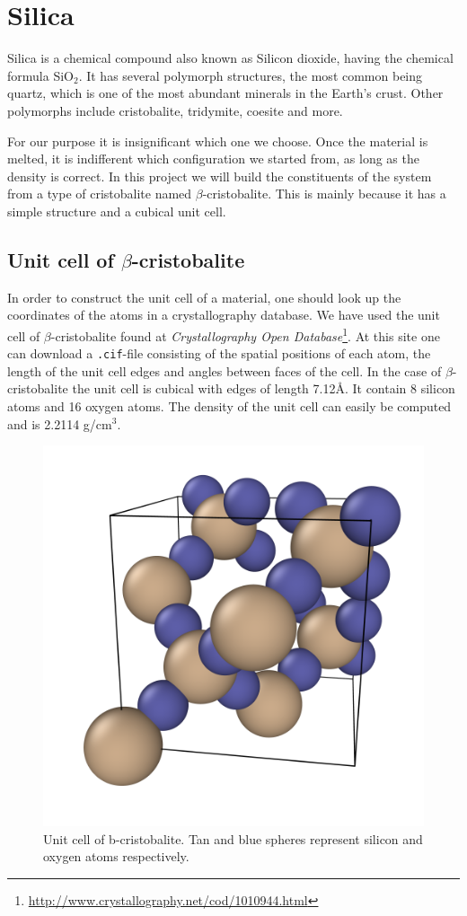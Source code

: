 \documentclass[twoside,english]{uiofysmaster}
\begin{document}
\section{Silica}
Silica is a chemical compound also known as Silicon dioxide, having the chemical formula SiO$_2$. It has several polymorph structures, the most common being quartz, which is one of the most abundant minerals in the Earth's crust. Other polymorphs include cristobalite, tridymite, coesite and more.    

For our purpose it is insignificant which one we choose. Once the material is melted, it is indifferent which configuration we started from, as long as the density is correct.
In this project we will build the constituents of the system from a type of cristobalite named $\beta$-cristobalite. This is mainly because it has a simple structure and a cubical unit cell.


\subsection{Unit cell of $\beta$-cristobalite}
In order to construct the unit cell of a material, one should look up the coordinates of the atoms in a crystallography database. We have used the unit cell of $\beta$-cristobalite found at \textit{Crystallography Open Database}\footnote{\href{http://www.crystallography.net/cod/1010944.html}{http://www.crystallography.net/cod/1010944.html}}. At this site one can download a \texttt{.cif}-file consisting of the spatial positions of each atom, the length of the unit cell edges and angles between faces of the cell. In the case of $\beta$-cristobalite the unit cell is cubical with edges of length 7.12Å. It contain 8 silicon atoms and 16 oxygen atoms. The density of the unit cell can easily be computed and is 2.2114 g/cm$^3$.

\begin{figure}
	\centering
	\includegraphics[width=0.7\linewidth]{figures/unitcell/unitcell.png}
	\caption{Unit cell of b-cristobalite. Tan and blue spheres represent silicon and oxygen atoms respectively.}
	\label{fig:unitcellbcristobalite}
\end{figure}
\end{document}
